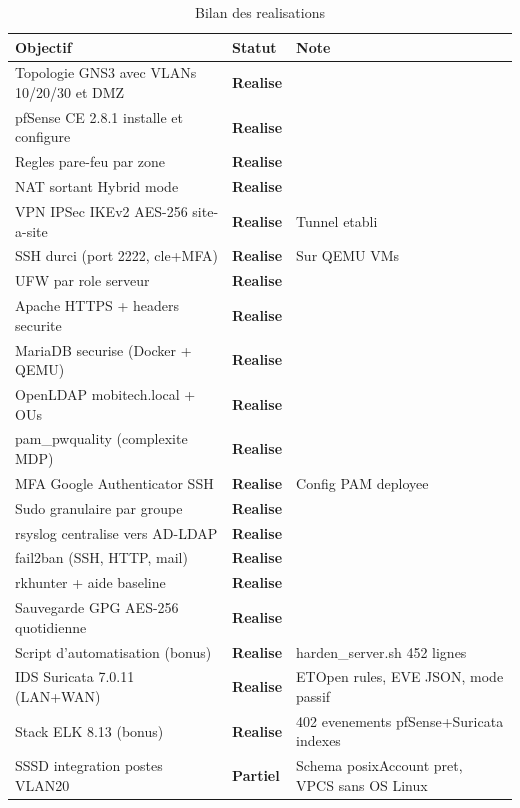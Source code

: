 \documentclass[11pt,a4paper]{article}
\begin{document}
\begin{table}[H]
\centering
\begin{tabular}{@{}p{7cm}lp{5cm}@{}}
\toprule
\textbf{Objectif} & \textbf{Statut} & \textbf{Note} \\
\midrule
Topologie GNS3 avec VLANs 10/20/30 et DMZ & \textcolor{okgreen}{\textbf{Realise}} & \\
pfSense CE 2.8.1 installe et configure & \textcolor{okgreen}{\textbf{Realise}} & \\
Regles pare-feu par zone & \textcolor{okgreen}{\textbf{Realise}} & \\
NAT sortant Hybrid mode & \textcolor{okgreen}{\textbf{Realise}} & \\
VPN IPSec IKEv2 AES-256 site-a-site & \textcolor{okgreen}{\textbf{Realise}} & Tunnel etabli \\
SSH durci (port 2222, cle+MFA) & \textcolor{okgreen}{\textbf{Realise}} & Sur QEMU VMs \\
UFW par role serveur & \textcolor{okgreen}{\textbf{Realise}} & \\
Apache HTTPS + headers securite & \textcolor{okgreen}{\textbf{Realise}} & \\
MariaDB securise (Docker + QEMU) & \textcolor{okgreen}{\textbf{Realise}} & \\
OpenLDAP mobitech.local + OUs & \textcolor{okgreen}{\textbf{Realise}} & \\
pam\_pwquality (complexite MDP) & \textcolor{okgreen}{\textbf{Realise}} & \\
MFA Google Authenticator SSH & \textcolor{okgreen}{\textbf{Realise}} & Config PAM deployee \\
Sudo granulaire par groupe & \textcolor{okgreen}{\textbf{Realise}} & \\
rsyslog centralise vers AD-LDAP & \textcolor{okgreen}{\textbf{Realise}} & \\
fail2ban (SSH, HTTP, mail) & \textcolor{okgreen}{\textbf{Realise}} & \\
rkhunter + aide baseline & \textcolor{okgreen}{\textbf{Realise}} & \\
Sauvegarde GPG AES-256 quotidienne & \textcolor{okgreen}{\textbf{Realise}} & \\
Script d'automatisation (bonus) & \textcolor{okgreen}{\textbf{Realise}} & harden\_server.sh 452 lignes \\
IDS Suricata 7.0.11 (LAN+WAN) & \textcolor{okgreen}{\textbf{Realise}} & ETOpen rules, EVE JSON, mode passif \\
Stack ELK 8.13 (bonus) & \textcolor{okgreen}{\textbf{Realise}} & 402 evenements pfSense+Suricata indexes \\
SSSD integration postes VLAN20 & \textcolor{warnred}{\textbf{Partiel}} & Schema posixAccount pret, VPCS sans OS Linux \\
\bottomrule
\end{tabular}
\caption{Bilan des realisations}
\label{tab:bilan}
\end{table}
\end{document}
